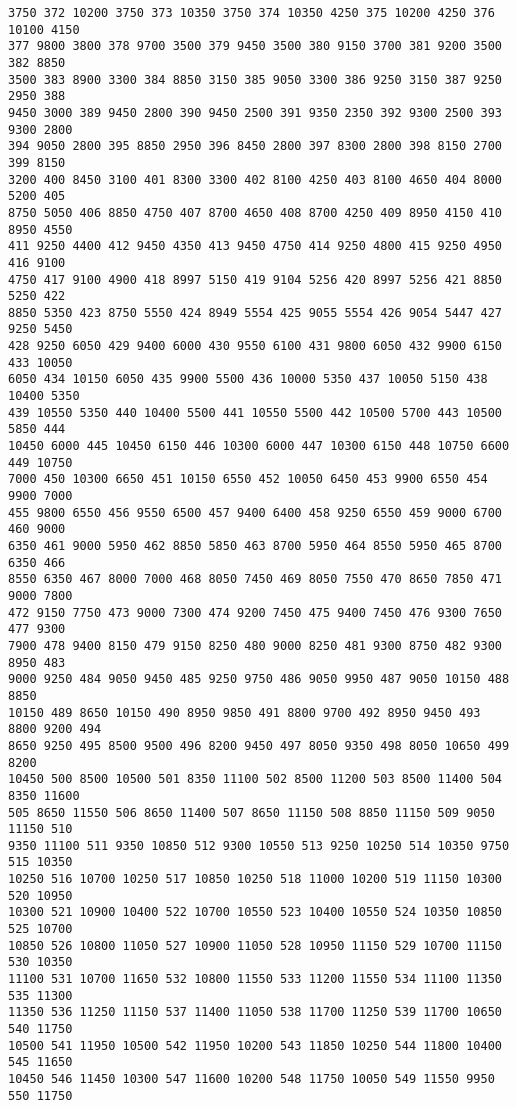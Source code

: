 \documentclass[11pt]{article}
\begin{document}
\begin{Verbatim}[commandchars=\\\{\}]
3750 372 10200 3750 373 10350 3750 374 10350 4250 375 10200 4250 376 10100 4150
377 9800 3800 378 9700 3500 379 9450 3500 380 9150 3700 381 9200 3500 382 8850
3500 383 8900 3300 384 8850 3150 385 9050 3300 386 9250 3150 387 9250 2950 388
9450 3000 389 9450 2800 390 9450 2500 391 9350 2350 392 9300 2500 393 9300 2800
394 9050 2800 395 8850 2950 396 8450 2800 397 8300 2800 398 8150 2700 399 8150
3200 400 8450 3100 401 8300 3300 402 8100 4250 403 8100 4650 404 8000 5200 405
8750 5050 406 8850 4750 407 8700 4650 408 8700 4250 409 8950 4150 410 8950 4550
411 9250 4400 412 9450 4350 413 9450 4750 414 9250 4800 415 9250 4950 416 9100
4750 417 9100 4900 418 8997 5150 419 9104 5256 420 8997 5256 421 8850 5250 422
8850 5350 423 8750 5550 424 8949 5554 425 9055 5554 426 9054 5447 427 9250 5450
428 9250 6050 429 9400 6000 430 9550 6100 431 9800 6050 432 9900 6150 433 10050
6050 434 10150 6050 435 9900 5500 436 10000 5350 437 10050 5150 438 10400 5350
439 10550 5350 440 10400 5500 441 10550 5500 442 10500 5700 443 10500 5850 444
10450 6000 445 10450 6150 446 10300 6000 447 10300 6150 448 10750 6600 449 10750
7000 450 10300 6650 451 10150 6550 452 10050 6450 453 9900 6550 454 9900 7000
455 9800 6550 456 9550 6500 457 9400 6400 458 9250 6550 459 9000 6700 460 9000
6350 461 9000 5950 462 8850 5850 463 8700 5950 464 8550 5950 465 8700 6350 466
8550 6350 467 8000 7000 468 8050 7450 469 8050 7550 470 8650 7850 471 9000 7800
472 9150 7750 473 9000 7300 474 9200 7450 475 9400 7450 476 9300 7650 477 9300
7900 478 9400 8150 479 9150 8250 480 9000 8250 481 9300 8750 482 9300 8950 483
9000 9250 484 9050 9450 485 9250 9750 486 9050 9950 487 9050 10150 488 8850
10150 489 8650 10150 490 8950 9850 491 8800 9700 492 8950 9450 493 8800 9200 494
8650 9250 495 8500 9500 496 8200 9450 497 8050 9350 498 8050 10650 499 8200
10450 500 8500 10500 501 8350 11100 502 8500 11200 503 8500 11400 504 8350 11600
505 8650 11550 506 8650 11400 507 8650 11150 508 8850 11150 509 9050 11150 510
9350 11100 511 9350 10850 512 9300 10550 513 9250 10250 514 10350 9750 515 10350
10250 516 10700 10250 517 10850 10250 518 11000 10200 519 11150 10300 520 10950
10300 521 10900 10400 522 10700 10550 523 10400 10550 524 10350 10850 525 10700
10850 526 10800 11050 527 10900 11050 528 10950 11150 529 10700 11150 530 10350
11100 531 10700 11650 532 10800 11550 533 11200 11550 534 11100 11350 535 11300
11350 536 11250 11150 537 11400 11050 538 11700 11250 539 11700 10650 540 11750
10500 541 11950 10500 542 11950 10200 543 11850 10250 544 11800 10400 545 11650
10450 546 11450 10300 547 11600 10200 548 11750 10050 549 11550 9950 550 11750

\end{Verbatim}
\end{document}
